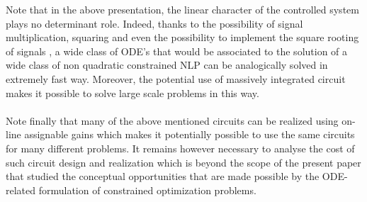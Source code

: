 \documentclass{article}
\begin{document}
Note that in the above presentation, the linear character of the controlled system plays no determinant role. Indeed, thanks to the possibility of signal multiplication, squaring and even the possibility to implement the square rooting of signals \cite{Filanovski:1992}, a wide class of ODE's that would be associated to the solution of a wide class of non quadratic constrained NLP can be analogically solved in extremely fast way. Moreover, the potential use of massively integrated circuit makes it possible to solve large scale problems in this way.\ \\ \ \\ 
Note finally that many of the above mentioned circuits can be realized using on-line assignable gains which makes it potentially possible to use the same circuits for many different problems. It remains however necessary to analyse the cost of such circuit design and realization which is beyond the scope of the present paper that studied the conceptual opportunities that are made possible by the ODE-related formulation of constrained optimization problems. 
\end{document}
